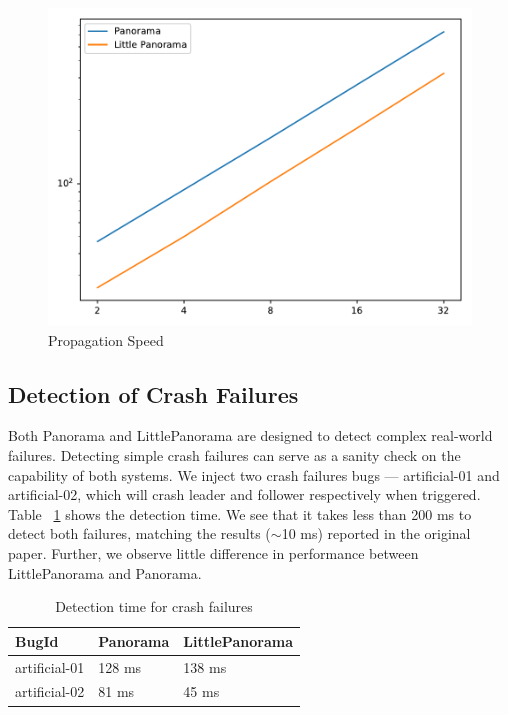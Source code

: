 \begin{figure}[!tb]
\centering
\includegraphics[scale=0.4]{figs/propagation.pdf}
\vspace{-1em}
\caption{Propagation Speed
\label{fig:propagation}
}
\end{figure}

\subsection{Detection of Crash Failures}
Both Panorama and LittlePanorama are designed to detect complex real-world failures. Detecting simple crash failures can serve as a sanity check on the capability of both systems. We inject two crash failures bugs --- artificial-01 and artificial-02, which will crash leader and follower respectively when triggered. Table ~\ref{tab:crashperf} shows the detection time. We see that it takes less than 200 ms to detect both failures, matching the results ($\sim$10 ms) reported in the original paper. Further, we observe little difference in performance between LittlePanorama and Panorama.

\begin{table}[!tb]
\begin{tabular}{p{}p{}p{}}%

\toprule
\textbf{BugId} & \textbf{Panorama} & \textbf{LittlePanorama} \\
\midrule
  artificial-01    &    128 ms  &  138 ms  \\
  artificial-02       &   81 ms   &  45 ms \\
\bottomrule
\end{tabular}
\vspace{0.5em}
\caption{Detection time for crash failures}
\label{tab:crashperf}
\end{table}

